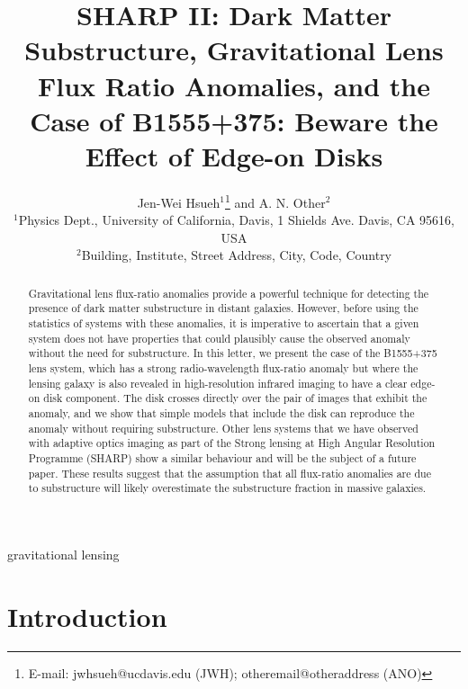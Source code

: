 \documentclass[useAMS,usenatbib]{mn2e}
\title[Beware the Effect of Edge-on Disks]{
SHARP II: Dark Matter Substructure, Gravitational Lens Flux Ratio
Anomalies, and the Case of B1555+375: Beware the Effect of Edge-on
Disks
}
\author[Hsueh et al.]{Jen-Wei Hsueh$^{1}$\thanks{E-mail:
jwhsueh@ucdavis.edu (JWH); otheremail@otheraddress (ANO)} and A. N.
Other$^{2}$\\
$^{1}$Physics Dept., University of California, Davis, 1 Shields Ave.
Davis, CA 95616, USA\\
$^{2}$Building, Institute, Street Address, City, Code, Country}
\begin{document}

\pagerange{\pageref{firstpage}--\pageref{lastpage}} 

\maketitle

\label{firstpage}

\begin{abstract}

Gravitational lens flux-ratio anomalies provide a powerful technique
for detecting the presence of dark matter substructure in distant
galaxies.  However, before using the statistics of systems with these
anomalies, it is imperative to ascertain that a given system does not
have properties that could plausibly cause the observed anomaly
without the need for substructure.  In this letter, we present the
case of the B1555+375 lens system, which has a strong radio-wavelength
flux-ratio anomaly but where the lensing galaxy is also revealed in
high-resolution infrared imaging to have a clear edge-on disk component.  The
disk crosses directly over the pair of images that exhibit the
anomaly, and we show that simple models that include the disk can
reproduce the anomaly without requiring substructure.  
Other lens systems that we have observed with adaptive optics imaging
as part of the Strong lensing at High Angular Resolution Programme (SHARP)
show a similar behaviour and will be the subject of a future paper.  
These results suggest that the assumption that
all flux-ratio anomalies are due to substructure will likely overestimate
the substructure fraction in massive galaxies.

\end{abstract}

\begin{keywords}
gravitational lensing
\end{keywords}

\section{Introduction}
\end{document}
